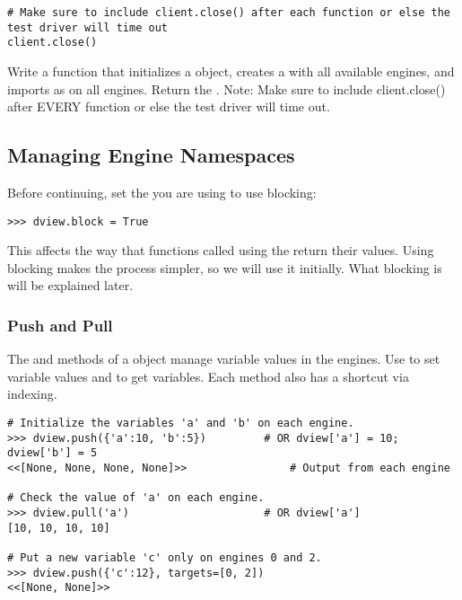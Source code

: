 \begin{lstlisting}
# Make sure to include client.close() after each function or else the test driver will time out
client.close()
\end{lstlisting}

\begin{problem} %
Write a function that initializes a  object, creates a  with all available engines, and imports  as  on all engines.
Return the . Note: Make sure to include client.close() after EVERY function or else the test driver will time out.
\end{problem}


\subsection*{Managing Engine Namespaces} %
Before continuing, set the  you are using to use blocking:
\begin{lstlisting}
>>> dview.block = True
\end{lstlisting}
This affects the way that functions called using the  return their values.
Using blocking makes the process simpler, so we will use it initially.
What blocking is will be explained later.

\subsubsection*{Push and Pull} %

The  and  methods of a  object manage variable values in the engines.
Use  to set variable values and  to get variables.
Each method also has a shortcut via indexing.

\begin{lstlisting}
# Initialize the variables 'a' and 'b' on each engine.
>>> dview.push({'a':10, 'b':5})         # OR dview['a'] = 10; dview['b'] = 5
<<[None, None, None, None]>>                # Output from each engine

# Check the value of 'a' on each engine.
>>> dview.pull('a')                     # OR dview['a']
[10, 10, 10, 10]

# Put a new variable 'c' only on engines 0 and 2.
>>> dview.push({'c':12}, targets=[0, 2])
<<[None, None]>>
\end{lstlisting}

